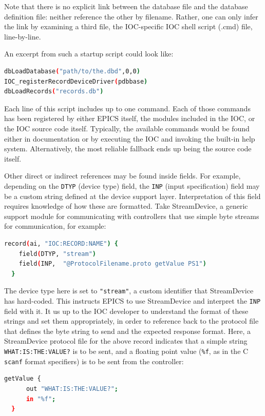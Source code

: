 \documentclass[letter,
               keeplastbox,   %
               ]{jacow}
\begin{document}
Note that there is no explicit link between the database file and the database
definition file: neither reference the other by filename.
Rather, one can only infer the link by examining a third file, the IOC-specific
IOC shell script (.cmd) file, line-by-line.

An excerpt from such a startup script could look like:
\begin{lstlisting}[language=bash]
dbLoadDatabase("path/to/the.dbd",0,0)
IOC_registerRecordDeviceDriver(pdbbase) 
dbLoadRecords("records.db")
\end{lstlisting}

Each line of this script includes up to one command. Each of those commands
has been registered by either EPICS itself, the modules included in the IOC,
or the IOC source code itself.  Typically, the available commands
would be found either in documentation or by executing the IOC and invoking the
built-in help system. Alternatively, the most reliable fallback ends up
being the source code itself.

Other direct or indirect references may be found inside fields.  
For example, depending on the \verb_DTYP_ (device type) field, the \verb_INP_
(input specification) field may be a custom string defined at the device
support layer. Interpretation of this field requires knowledge of how
these are formatted.  Take StreamDevice\cite{streamdevice}, a generic
support module for communicating with controllers that use simple byte
streams for communication, for example:
\begin{lstlisting}[language=bash]
  record(ai, "IOC:RECORD:NAME") {
    field(DTYP, "stream")
    field(INP,  "@ProtocolFilename.proto getValue PS1")
  }
\end{lstlisting}

The device type here is set to \verb_"stream"_, a custom identifier that
StreamDevice has hard-coded.  This instructs EPICS to use StreamDevice
and interpret the \verb_INP_ field with it.  It us up to the IOC developer to
understand the format of these strings and set them appropriately, in order
to reference back to the protocol file that defines the byte string to send
and the expected response format. Here, a StreamDevice protocol file for
the above record indicates that a simple string \verb_WHAT:IS:THE:VALUE?_
is to be sent, and a floating point value (\verb_%f_, as in the C \verb_scanf_
format specifiers) is to be sent from the controller:
\begin{lstlisting}[language=bash]
  getValue {
      out "WHAT:IS:THE:VALUE?";
      in "%f";
  }
\end{lstlisting}
\end{document}
